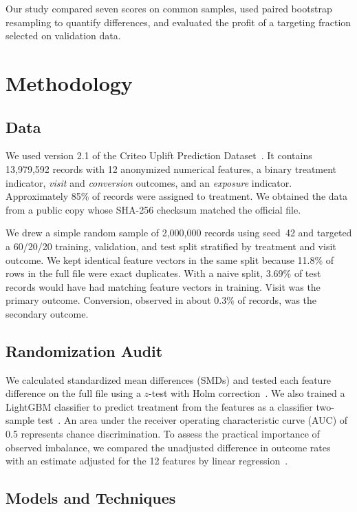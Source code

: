 \documentclass[conference]{IEEEtran}
\begin{document}
Our study compared seven scores on common samples, used paired bootstrap
resampling to quantify differences, and evaluated the profit of a
targeting fraction selected on validation data.

\section{Methodology}

\subsection{Data}

We used version 2.1 of the Criteo Uplift Prediction
Dataset~\cite{diemert2018,criteo}. It contains 13,979,592 records with
12 anonymized numerical features, a binary treatment indicator,
\emph{visit} and \emph{conversion} outcomes, and an \emph{exposure}
indicator. Approximately 85\% of records were assigned to treatment.
We obtained the data from a public copy whose SHA-256 checksum matched
the official file.

We drew a simple random sample of 2,000,000 records using seed~42 and
targeted a 60/20/20 training, validation, and test split stratified by
treatment and visit outcome. We kept identical feature vectors in the
same split because 11.8\% of rows in the full file were exact duplicates.
With a naive split, 3.69\% of test records would have had matching
feature vectors in training. Visit was the primary outcome. Conversion,
observed in about 0.3\% of records, was the secondary outcome.

\subsection{Randomization Audit}

We calculated standardized mean differences (SMDs) and tested each
feature difference on the full file using a \(z\)-test with Holm
correction~\cite{holm1979}. We also trained a LightGBM classifier to
predict treatment from the features as a classifier two-sample
test~\cite{lopezpaz2017}. An area under the receiver operating
characteristic curve (AUC) of 0.5 represents chance discrimination.
To assess the practical importance of observed imbalance, we compared
the unadjusted difference in outcome rates with an estimate adjusted
for the 12 features by linear regression~\cite{lin2013}.

\subsection{Models and Techniques}
\end{document}
